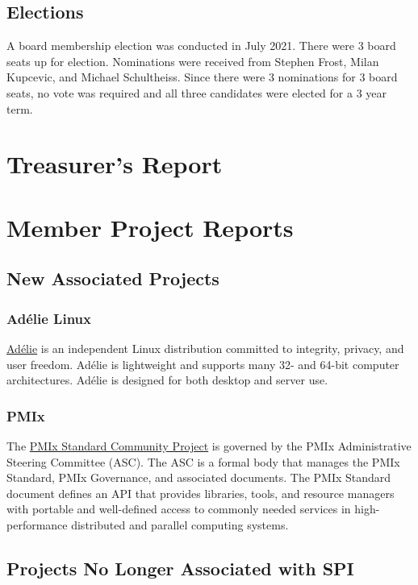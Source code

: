 \documentclass[a4paper]{report}
\begin{document}
\section{Elections}

A board membership election was conducted in July 2021.  There were 3 board seats up for election.  Nominations were received from Stephen Frost, Milan Kupcevic, and Michael Schultheiss.  Since there were 3 nominations for 3 board seats, no vote was required and all three candidates were elected for a 3 year term.

\chapter{Treasurer's Report}

\chapter{Member Project Reports}

\section{New Associated Projects}

\subsection{Adélie Linux}

\href{https://www.adelielinux.org/}{Adélie} is an independent Linux distribution committed to integrity, privacy, and user freedom.  Adélie is lightweight and supports many 32- and 64-bit computer architectures. Adélie is designed for both desktop and server use.

\subsection{PMIx}

The \href{https://pmix.org/}{PMIx Standard Community Project} is governed by the PMIx Administrative Steering Committee (ASC). The ASC is a formal body that manages the PMIx Standard, PMIx Governance, and associated documents. The PMIx Standard document defines an API that provides libraries, tools, and resource managers with portable and well-defined access to commonly needed services in high-performance distributed and parallel computing systems.

\section{Projects No Longer Associated with SPI}
\end{document}
